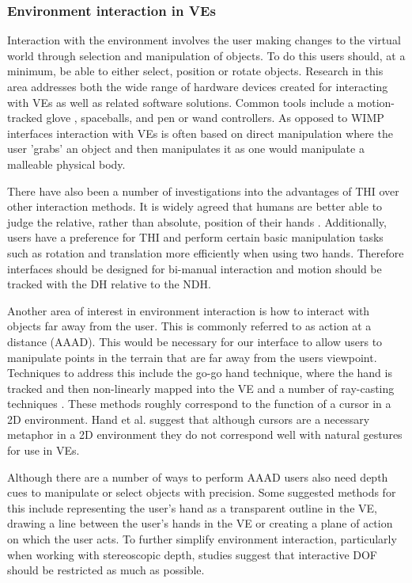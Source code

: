 \documentclass{sig-alternate-05-2015}
\begin{document}
\subsubsection{Environment interaction in VEs}
 Interaction with the environment involves the user making changes to the virtual world through selection and manipulation of objects. To do this users should, at a minimum, be able to either select, position or rotate objects\cite{Bowman2001}. Research in this area addresses both the wide range of hardware devices created for interacting with VEs as well as related software solutions. Common tools include a motion-tracked glove \cite{Zimmerman1986}, spaceballs\cite{Hand1997}, and pen or wand controllers\cite{Schultheis2012}. As opposed to WIMP interfaces interaction with VEs is often based on direct manipulation where the user 'grabs' an object and then manipulates it as one would manipulate a malleable physical body.
  
 There have also been a number of investigations into the advantages of THI over other interaction methods. It is widely agreed that humans are better able to judge the relative, rather than absolute, position of their hands \cite{Bowman1998, Buxton1986}. Additionally, users have a preference for THI\cite{Buxton1986} and perform certain basic manipulation tasks such as rotation and translation more efficiently when using two hands\cite{Schultheis2012,Balakrishnan1999}. Therefore interfaces should be designed for bi-manual interaction and motion should be tracked with the DH relative to the NDH\cite{Hinckley1994}.
 
 Another area of interest in environment interaction is how to interact with objects far away from the user. This is commonly referred to as action at a distance (AAAD). This would be necessary for our interface to allow users to manipulate points in the terrain that are far away from the users viewpoint. Techniques to address this include the go-go hand technique\cite{Poupyrev1996}, where the hand is tracked and then non-linearly mapped into the VE and a number of ray-casting techniques \cite{Bowman2001}. These methods roughly correspond to the function of a cursor in a 2D environment. Hand et al.\cite{Hand1997} suggest that although cursors are a necessary metaphor in a 2D environment they do not correspond well with natural gestures for use in VEs.
 
 Although there are a number of ways to perform AAAD users also need depth cues to manipulate or select objects with precision.\cite{Schultheis2012} Some suggested methods for this include representing the user's hand as a transparent outline in the VE\cite{Hinckley1994}, drawing a line between the user's hands in the VE\cite{Schultheis2012} or creating a plane of action\cite{Mine2014} on which the user acts. To further simplify environment interaction, particularly when working with stereoscopic depth, studies suggest that interactive DOF should be restricted as much as possible\cite{Bowman2001}.
\end{document}

